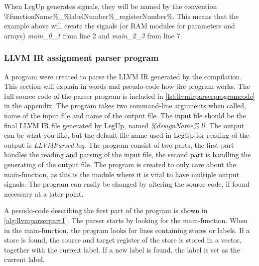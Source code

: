 When LegUp generates signals, they will be named by the convention \%functionName\%\_\%labelNumber\%\_registerNumber\%. This means that the example above will create the signals (or RAM modules for parameters and arrays) \textit{main\_0\_1} from line 2 and \textit{main\_2\_3} from line 7.
\subsubsection{LLVM IR assignment parser program}
A program were created to parse the LLVM IR generated by the compilation. This section will explain in words and pseudo-code how the program works. The full source code of the parser program is included in \ref{lst:llvmirparserprogramcode} in the appendix. The program takes two command-line arguments when called, name of the input file and name of the output file. The input file should be the final LLVM IR file generated by LegUp, named \textit{\%designName\%.ll}. The output can be what you like, but the default file-name used in LegUp for reading of the output is \textit{LLVMParsed.log}. The program consist of two parts, the first part handles the reading and parsing of the input file, the second part is handling the generating of the output file. The program is created to only care about the main-function, as this is the module where it is vital to have multiple output signals. The program can easily be changed by altering the source code, if found necessary at a later point.

A pesudo-code describing the first part of the program is shown in \cref{alg:llvmparserpart1}. The parser starts by looking for the main-function. When in the main-function, the program looks for lines containing stores or labels. If a store is found, the source and target register of the store is stored in a vector, together with the current label. If a new label is found, the label is set as the current label.


